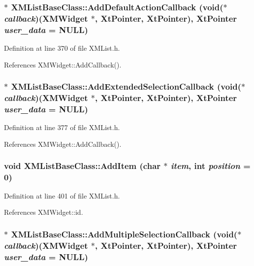 \subsubsection{$\ast$ XMList\-Base\-Class::Add\-Default\-Action\-Callback (void($\ast$ {\em callback})({\bf XMWidget} $\ast$, Xt\-Pointer, Xt\-Pointer), Xt\-Pointer {\em user\_\-data} = NULL)\hspace{0.3cm}{\tt  [inline]}}\label{classXMListBaseClass_a14}




Definition at line 370 of file XMList.h.

References XMWidget::Add\-Callback().
\subsubsection{$\ast$ XMList\-Base\-Class::Add\-Extended\-Selection\-Callback (void($\ast$ {\em callback})({\bf XMWidget} $\ast$, Xt\-Pointer, Xt\-Pointer), Xt\-Pointer {\em user\_\-data} = NULL)\hspace{0.3cm}{\tt  [inline]}}\label{classXMListBaseClass_a15}




Definition at line 377 of file XMList.h.

References XMWidget::Add\-Callback().
\subsubsection{\setlength{\rightskip}{0pt plus 5cm}void XMList\-Base\-Class::Add\-Item (char $\ast$ {\em item}, int {\em position} = 0)\hspace{0.3cm}{\tt  [inline]}}\label{classXMListBaseClass_a18}




Definition at line 401 of file XMList.h.

References XMWidget::id.
\subsubsection{$\ast$ XMList\-Base\-Class::Add\-Multiple\-Selection\-Callback (void($\ast$ {\em callback})({\bf XMWidget} $\ast$, Xt\-Pointer, Xt\-Pointer), Xt\-Pointer {\em user\_\-data} = NULL)\hspace{0.3cm}{\tt  [inline]}}\label{classXMListBaseClass_a16}




